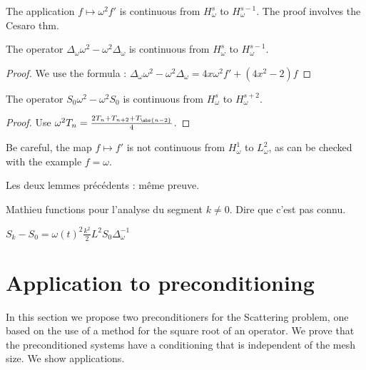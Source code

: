 \documentclass[]{article}
\begin{document}
\begin{Lem}
	The application $f \mapsto \omega^2 f'$ is continuous from $H^s_\omega$ to $H^{s-1}_\omega$.
	The proof involves the Cesaro thm. 
\end{Lem}
\begin{Lem}
	The operator $\Delta_{\omega}\omega^2 - \omega^2 \Delta_{\omega}$ is continuous from $H_{\omega}^s$ to $H_{\omega}^{s-1}$. 
	\begin{proof}
		We use the formula : $\Delta_{\omega}\omega^2 - \omega^2 \Delta_{\omega} = 4x\omega^2f' + (4x^2 - 2)f$
	\end{proof}
\end{Lem}
\begin{Lem}
	The operator $S_0\omega^2 - \omega^2S_0$ is continuous from $H^s_{\omega}$ to $H^{s+2}_\omega$.
	\begin{proof}
		Use $\omega^2 T_n = \frac{2T_n + T_{n+2} + T_{\abs{n-2}}}{4}$.
	\end{proof} 
\end{Lem}
Be careful, the map $f\mapsto f'$ is not continuous from $H^1_{\omega}$ to $L^2_{\omega}$, as can be checked with the example $f = \omega$. 

Les deux lemmes précédents : même preuve.


\begin{Rem}
	Mathieu functions pour l'analyse du segment $k\neq 0$. Dire que c'est pas connu. 
\end{Rem}

\begin{Lem}
	$S_k - S_0 = \omega(t)^2\frac{k^2}{2}L^2 S_0 \Delta_{\omega}^{-1}$ 
\end{Lem}

\section{Application to preconditioning}

In this section we propose two preconditioners for the Scattering problem, one based on the use of a method for the square root of an operator. We prove that the preconditioned systems have a conditioning that is independent of the mesh size. We show applications. 



\end{document}
